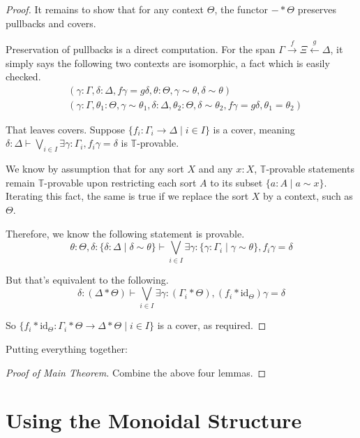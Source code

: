 \documentclass{article}
\newcommand*{\T}{\mathbb{T}}
\begin{document}
\begin{proof}
    It remains to show that for any context \(\Theta\), the functor \(- * \Theta\) preserves pullbacks and covers.

    Preservation of pullbacks is a direct computation. For the span \(\Gamma \xrightarrow{f} \Xi \xleftarrow{g} \Delta\),
    it simply says the following two contexts are isomorphic, a fact which is easily checked.
    \begin{align*}
        &(\gamma : \Gamma, \delta : \Delta, f\gamma = g\delta, \theta : \Theta, \gamma \sim \theta, \delta \sim \theta) \\
        &(\gamma : \Gamma, \theta_1 : \Theta, \gamma \sim \theta_1, \delta : \Delta, \theta_2 : \Theta, \delta \sim \theta_2, f\gamma = g\delta, \theta_1 = \theta_2)
    \end{align*}

    That leaves covers. Suppose \(\{f_i : \Gamma_i \to \Delta \mid i \in I\}\) is a cover,
    meaning \(\delta : \Delta \vdash \bigvee_{i \in I} \exists \gamma : \Gamma_i, f_i\gamma = \delta\) is \(\T\)-provable.

    We know by assumption that for any sort \(X\) and any \(x : X\),
    \(\T\)-provable statements remain \(\T\)-provable upon restricting each sort \(A\) to its subset \(\{a : A \mid a \sim x\}\).
    Iterating this fact, the same is true if we replace the sort \(X\) by a context, such as \(\Theta\).

    Therefore, we know the following statement is provable.
    \[\theta : \Theta, \delta : \{\delta : \Delta \mid \delta \sim \theta\} \vdash \bigvee_{i \in I} \exists \gamma : \{\gamma : \Gamma_i \mid \gamma \sim \theta\}, f_i\gamma = \delta\]

    But that's equivalent to the following.
    \[\delta : (\Delta * \Theta) \vdash \bigvee_{i \in I} \exists \gamma : (\Gamma_i * \Theta), (f_i * \mathrm{id}_\Theta)\gamma = \delta\]

    So \(\{f_i * \mathrm{id}_\Theta : \Gamma_i * \Theta \to \Delta * \Theta \mid i \in I\}\) is a cover, as required.
\end{proof}

Putting everything together:

\begin{proof}[Proof of Main Theorem]
    Combine the above four lemmas.
\end{proof}

\section{Using the Monoidal Structure}
\end{document}
